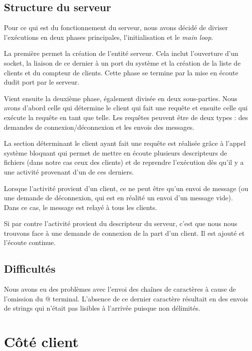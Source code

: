 \documentclass[11pt,a4paper]{article}
\begin{document}
\subsection{Structure du serveur}

Pour ce qui est du fonctionnement du serveur,
nous avons décidé de diviser l'exécutions en deux phases
principales, l'initialisation et le \emph{main loop}.

La première permet la création de l'entité serveur. Cela
inclut l'ouverture d'un socket, la liaison de ce dernier à
un port du système et la création de la liste de clients et du
compteur de clients. Cette phase se termine par la mise en
écoute dudit port par le serveur.

Vient ensuite la deuxième phase, également divisée en deux
sous-parties. Nous avons d'abord celle qui détermine le
client qui fait une requête et ensuite celle qui exécute la requête
en tant que telle. Les requêtes peuvent être de deux types :
des demandes de connexion/déconnexion et les envois des
messages.

La section déterminant le client ayant fait une requête est
réalisée grâce à l'appel système bloquant \verb@select@ qui permet de
mettre en écoute plusieurs descripteurs de fichiers (dans
notre cas ceux des clients) et de reprendre l'exécution dès
qu'il y a une activité provenant d'un de ces derniers.

Lorsque l'activité provient d'un client, ce ne peut être
qu'un envoi de message (ou une demande de déconnexion, qui
est en réalité un envoi d'un message vide). Dans ce cas, le
message est relayé à tous les clients.

Si par contre l'activité provient du descripteur du serveur,
c'est que nous nous trouvons face à une demande de connexion de la
part d'un client. Il est ajouté et l'écoute continue.

\subsection{Difficultés}

Nous avons eu des problèmes avec l'envoi des chaînes de
caractères à cause de l'omission du \verb@\0@ terminal.
L'absence de ce dernier caractère résultait en des envois de strings
qui n'était pas lisibles à l'arrivée puisque non délimités.




\section{Côté client}
\end{document}
